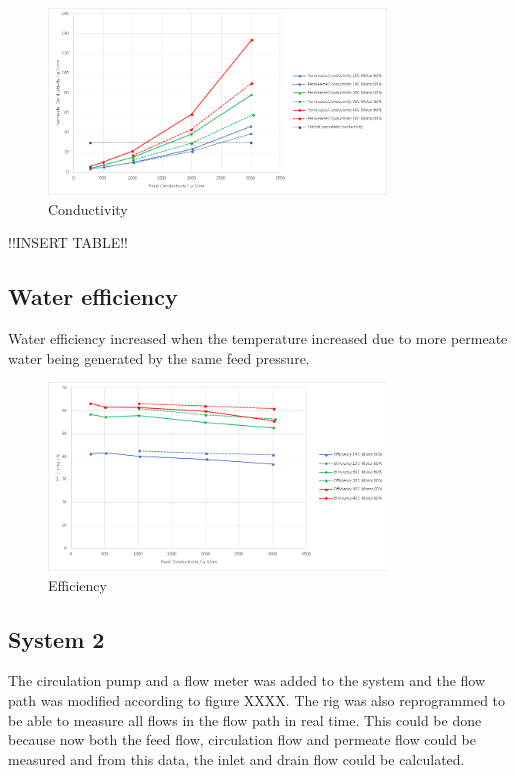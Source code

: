 \begin{figure}[H]
    \centering
    \includegraphics[width=0.8\textwidth]{PermCond}
    \caption{Conductivity}
    \label{fig:PressConn}
\end{figure}

!!INSERT TABLE!!

\subsection{Water efficiency}

Water efficiency increased when the temperature increased due to more permeate water being generated by the same feed pressure.

\begin{figure}[H]
    \centering
    \includegraphics[width=0.8\textwidth]{Efficiency}
    \caption{Efficiency}
    \label{fig:PressConn}
\end{figure}

\newpage

\subsection{System 2}

The circulation pump and a flow meter was added to the system and the flow path was modified according to figure XXXX. The rig was also reprogrammed to be able to measure all flows in the flow path in real time. This could be done because now both the feed flow, circulation flow and permeate flow could be measured and from this data, the inlet and drain flow could be calculated. 


